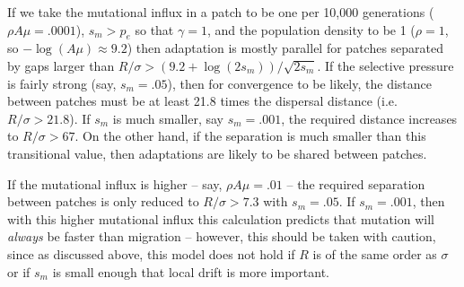 \documentclass{article}
\newcommand{\linelabel}[1]{}
\begin{document}

If we take the mutational influx in a patch to be one per 10,000 generations ($\rho A \mu = .0001$),
$s_m>p_e$ so that $\gamma=1$,
and the population density to be 1 ($\rho =1$, so $-\log(A\mu)\approx 9.2$)
then adaptation is mostly parallel for patches separated by gaps larger than $R/\sigma > (9.2+\log(2s_m))/\sqrt{2s_m}$.
If the selective pressure is fairly strong (say, $s_m=.05$),
then for convergence to be likely,
the distance between patches must be at least 21.8 times the dispersal distance (i.e.\ $R/\sigma > 21.8$).
If $s_m$ is much smaller, say $s_m = .001$, 
the required distance increases to $R/\sigma > 67$.
On the other hand, if the separation is much smaller than this transitional value, 
then adaptations are likely to be shared between patches.

If the mutational influx is higher -- say, $\rho A \mu = .01$ --
the required separation between patches is only reduced to $R/\sigma > 7.3$ with $s_m=.05$.
If $s_m=.001$, then with this higher mutational influx this calculation predicts that mutation will \emph{always} be faster than migration
-- however, this should be taken with caution,
since as discussed above, this model does not hold if $R$ is of the same order as $\sigma$
or if $s_m$ is small enough that local drift is more important.
\linelabel{rr:separated_patches}
\end{document}
